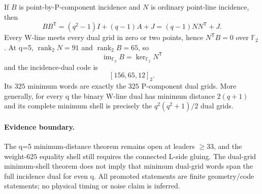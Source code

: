 If $B$ is point-by-P-component incidence and $N$ is ordinary point-line incidence, then
\[
  BB^{\mathsf T}=(q^2-1)I+(q-1)A+J=(q-1)NN^{\mathsf T}+J.
\]
Every W-line meets every dual grid in zero or two points, hence $N^{\mathsf T}B=0$ over $\mathbb F_2$.  At q=5, $\operatorname{rank}_2N=91$ and $\operatorname{rank}_2B=65$, so
\[
  \operatorname{im}_{\mathbb F_2}B=\ker_{\mathbb F_2}N^{\mathsf T}
\]
and the incidence-dual code is
\[
  \boxed{[156,65,12]_2}.
\]
Its $325$ minimum words are exactly the $325$ P-component dual grids.  More generally, for every q the binary W-line dual has minimum distance $2(q+1)$ and its complete minimum shell is precisely the $q^2(q^2+1)/2$ dual grids.

\paragraph{Evidence boundary.}
The q=5 minimum-distance theorem remains open at leaders $\ge33$, and the weight-$625$ equality shell still requires the connected L-side gluing.  The dual-grid minimum-shell theorem does not imply that minimum dual-grid words span the full incidence dual for even q.  All promoted statements are finite geometry/code statements; no physical timing or noise claim is inferred.
\fi
